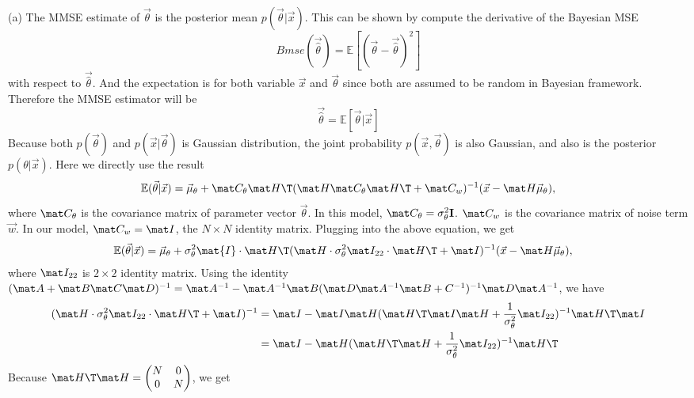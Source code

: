 \documentclass[12pt]{article}
\begin{document}
(a) The MMSE estimate of $\vec \theta$ is the posterior mean $p(\vec \theta |
\vec x)$. This can be shown by compute the derivative  of the Bayesian MSE 
\begin{equation*}
  Bmse( \vec {\hat\theta}) = \mathbb{E} [(\vec \theta - \vec{\hat\theta})^2]
\end{equation*}
with respect to $ \vec {\hat\theta}$. And the expectation is for both variable
$\vec x$ and $\vec \theta$ since both are assumed to be random in Bayesian
framework. Therefore the MMSE estimator will be
\begin{equation*}
\vec {\hat\theta} = \mathbb{E}[\vec\theta | \vec x]
\end{equation*}
Because both $p(\vec\theta)$ and $p(\vec x| \vec\theta)$ is Gaussian
distribution, the joint probability $p(\vec x, \vec \theta)$ is also Gaussian,
and also is the posterior $p(\theta|\vec x)$. Here we directly use the result
\citep[ch. 10.6]{kay1998fundamentals}
\begin{equation*}
  \mathbb{E}(\vec \theta | \vec x) = \vec \mu_\theta + \mat C_\theta \mat H\T (\mat H \mat C_\theta \mat H\T + \mat C_w)^{-1} (\vec x - \mat H \vec \mu_\theta), 
\end{equation*}
where $\mat C_\theta$ is the covariance matrix of parameter vector $\vec
\theta$. In this model, $\mat C_\theta = \sigma_\theta^2\mathbf{I}$. $\mat C_w$
is the covariance matrix of noise term $\vec w$. In our model, $\mat C_w = \mat
I$, the $N\times N$ identity matrix. Plugging into the above equation, we get
\begin{align*}
  \mathbb{E}(\vec \theta | \vec x) &= \vec \mu_\theta + \sigma_\theta^2 \mat{I} \cdot \mat H\T(\mat H \cdot \sigma_\theta^2 \mat I_{22} \cdot \mat H\T + \mat I)^{-1} (\vec x - \mat H \vec \mu_\theta),
\end{align*}
where $\mat I_{22}$ is $2\times2$ identity matrix. Using the identity $(\mat A +
\mat B \mat C \mat D)^{-1} = \mat A^{-1} - \mat A^{-1}\mat B (\mat D \mat A^{-1}
\mat B + C^{-1})^{-1} \mat D \mat A^{-1}$, we have
\begin{align*}
  (\mat H \cdot \sigma_\theta^2 \mat I_{22} \cdot \mat H\T + \mat I)^{-1} &= \mat I - \mat I \mat H(\mat H\T \mat I \mat H + \frac{1}{\sigma_\theta^2}\mat I_{22})^{-1} \mat H\T \mat I\\
  &= \mat I - \mat H(\mat H\T\mat H + \frac{1}{\sigma_\theta^2} \mat I_{22})^{-1} \mat H\T
\end{align*}
Because $\mat H\T \mat H = \begin{pmatrix}N & 0 \\ 0 & N\end{pmatrix}$, we get
\end{document}
